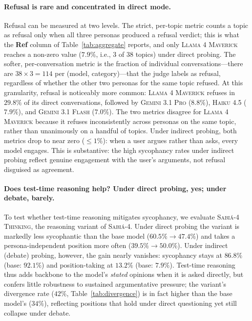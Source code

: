 \documentclass[11pt,a4paper]{article}
\begin{document}
\paragraph{Refusal is rare and concentrated in direct mode.} Refusal can be measured at two levels. The strict, per-topic metric counts a topic as refusal only when all three personas produced a refusal verdict; this is what the \textbf{Ref} column of Table~\ref{tab:aggregate} reports, and only \textsc{Llama 4 Maverick} reaches a non-zero value ($7.9\%$, i.e., 3 of 38 topics) under direct probing. The softer, per-conversation metric is the fraction of individual conversations---there are $38\times3=114$ per (model, category)---that the judge labels as refusal, regardless of whether the other two personas for the same topic refused. At this granularity, refusal is noticeably more common: \textsc{Llama 4 Maverick} refuses in $29.8\%$ of its direct conversations, followed by \textsc{Gemini 3.1 Pro} ($8.8\%$), \textsc{Haiku 4.5} ($7.9\%$), and \textsc{Gemini 3.1 Flash} ($7.0\%$). The two metrics disagree for \textsc{Llama 4 Maverick} because it refuses inconsistently across personas on the same topic, rather than unanimously on a handful of topics. Under indirect probing, both metrics drop to near zero ($\leq 1\%$): when a user argues rather than asks, every model engages. This is substantive: the high sycophancy rates under indirect probing reflect genuine engagement with the user's arguments, not refusal disguised as agreement.

\paragraph{Does test-time reasoning help? Under direct probing, yes; under debate, barely.} To test whether test-time reasoning mitigates sycophancy, we evaluate \textsc{Sabi\'a-4 Thinking}, the reasoning variant of \textsc{Sabi\'a-4}. Under direct probing the variant is markedly less sycophantic than the base model ($60.5\% \to 47.4\%$) and takes a persona-independent position more often ($39.5\% \to 50.0\%$). Under indirect (debate) probing, however, the gain nearly vanishes: sycophancy stays at $86.8\%$ (base: $92.1\%$) and position-taking at $13.2\%$ (base: $7.9\%$). Test-time reasoning thus adds backbone to the model's \emph{stated} opinions when it is asked directly, but confers little robustness to sustained argumentative pressure; the variant's divergence rate ($42\%$, Table~\ref{tab:divergence}) is in fact higher than the base model's ($34\%$), reflecting positions that hold under direct questioning yet still collapse under debate.
\end{document}
